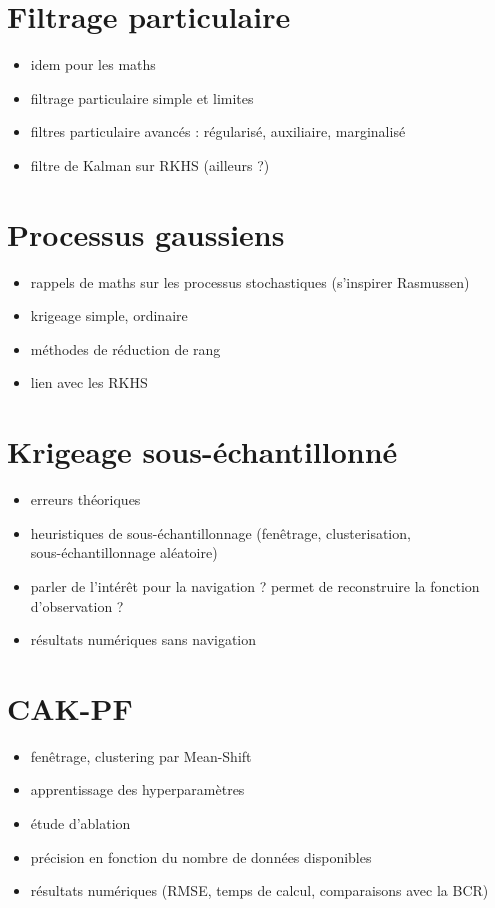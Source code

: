 \section{Filtrage particulaire}

\begin{itemize}
	\item idem pour les maths
	\item filtrage particulaire simple et limites
	\item filtres particulaire avancés : régularisé, auxiliaire, marginalisé
	\item filtre de Kalman sur RKHS (ailleurs ?)
\end{itemize}

\section{Processus gaussiens}

\begin{itemize}
	\item rappels de maths sur les processus stochastiques (s'inspirer Rasmussen)
	\item krigeage simple, ordinaire
	\item méthodes de réduction de rang
	\item lien avec les RKHS
\end{itemize}

\section{Krigeage sous-échantillonné}

\begin{itemize}
	\item erreurs théoriques
	\item heuristiques de sous-échantillonnage (fenêtrage, clusterisation,\\sous-échantillonnage aléatoire)
	\item parler de l'intérêt pour la navigation ? permet de reconstruire la fonction d'observation ?
	\item résultats numériques sans navigation
\end{itemize}

\section{CAK-PF}

\begin{itemize}
	\item fenêtrage, clustering par Mean-Shift
	\item apprentissage des hyperparamètres
	\item étude d'ablation
	\item précision en fonction du nombre de données disponibles
	\item résultats numériques (RMSE, temps de calcul, comparaisons avec la BCR)
\end{itemize}

